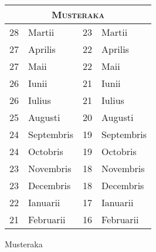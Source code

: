 %
\begin{tabnums} %
\normalsize
\centering
\newcommand{\hts}{\scriptsize}
\newcommand{\cwd}{4em}
%
\newcommand{\da}{\scriptsize{†}}
\begin{tabular}{@{} r@{ }l r@{ }l @{}}
\toprule
\multicolumn{4}{c}{\Large\textsc{Musteraka}} \\
\toprule
28&Martii     & 23&Martii \\
27&Aprilis    & 22&Aprilis \\
27&Maii       & 22&Maii \\
26&Iunii      & 21&Iunii \\
26&Iulius     & 21&Iulius \\
25&Augusti    & 20&Augusti \\
24&Septembris & 19&Septembris \\
24&Octobris   & 19&Octobris \\
23&Novembris  & 18&Novembris \\
23&Decembris  & 18&Decembris\\
22&Ianuarii   & 17&Ianuarii \\
21&Februarii  & 16&Februarii\\
\bottomrule
\end{tabular}
%
\caption{Musteraka}
\label{tab:p210a}
%
\end{tabnums}
